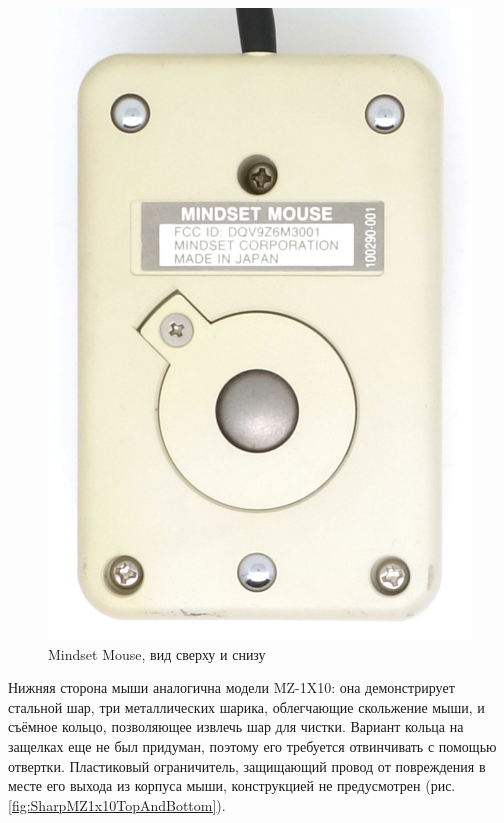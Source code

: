 \documentclass[11pt, a4paper]{article}
\begin{document}
\begin{figure}[h]
    \includegraphics[scale=0.55]{1984_mindset_mouse/bottom_30.jpg}
    \caption{Mindset Mouse, вид сверху и снизу}
    \label{fig:MindsetMouseTopAndBottom}
\end{figure}

Нижняя сторона мыши аналогична модели MZ-1X10: она демонстрирует стальной шар, три металлических шарика, облегчающие скольжение мыши, и съёмное кольцо, позволяющее извлечь шар для чистки. Вариант кольца на защелках еще не был придуман, поэтому его требуется отвинчивать с помощью отвертки. Пластиковый ограничитель, защищающий провод от повреждения в месте его выхода из корпуса мыши, конструкцией не предусмотрен (рис. \ref{fig:SharpMZ1x10TopAndBottom}).
\end{document}
